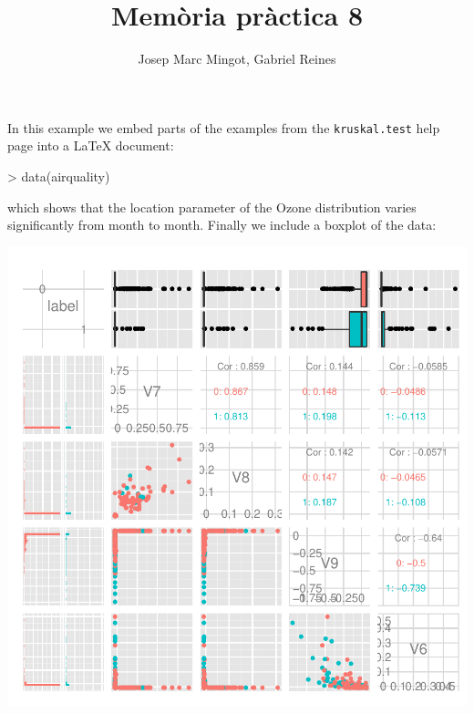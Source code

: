 \documentclass[a4paper,10pt]{article}
\title{Memòria pràctica 8}
\author{Josep Marc Mingot, Gabriel Reines}
\begin{document}

\maketitle



In this example we embed parts of the examples from the
\texttt{kruskal.test} help page into a \LaTeX{} document:
\begin{Schunk}
\begin{Sinput}
> data(airquality)
\end{Sinput}
\end{Schunk}
which shows that the location parameter of the Ozone 
distribution varies significantly from month to month. Finally we
include a boxplot of the data:

\begin{center}
\includegraphics{memoria-002}
\end{center}
\end{document}
